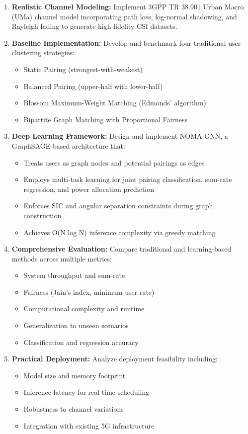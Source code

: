\begin{enumerate}
    \item \textbf{Realistic Channel Modeling:} Implement 3GPP TR 38.901 Urban Macro (UMa) channel model incorporating path loss, log-normal shadowing, and Rayleigh fading to generate high-fidelity CSI datasets.
    
    \item \textbf{Baseline Implementation:} Develop and benchmark four traditional user clustering strategies:
    \begin{itemize}
        \item Static Pairing (strongest-with-weakest)
        \item Balanced Pairing (upper-half with lower-half)
        \item Blossom Maximum-Weight Matching (Edmonds' algorithm)
        \item Bipartite Graph Matching with Proportional Fairness
    \end{itemize}
    
    \item \textbf{Deep Learning Framework:} Design and implement NOMA-GNN, a GraphSAGE-based architecture that:
    \begin{itemize}
        \item Treats users as graph nodes and potential pairings as edges
        \item Employs multi-task learning for joint pairing classification, sum-rate regression, and power allocation prediction
        \item Enforces SIC and angular separation constraints during graph construction
        \item Achieves O(N log N) inference complexity via greedy matching
    \end{itemize}
    
    \item \textbf{Comprehensive Evaluation:} Compare traditional and learning-based methods across multiple metrics:
    \begin{itemize}
        \item System throughput and sum-rate
        \item Fairness (Jain's index, minimum user rate)
        \item Computational complexity and runtime
        \item Generalization to unseen scenarios
        \item Classification and regression accuracy
    \end{itemize}
    
    \item \textbf{Practical Deployment:} Analyze deployment feasibility including:
    \begin{itemize}
        \item Model size and memory footprint
        \item Inference latency for real-time scheduling
        \item Robustness to channel variations
        \item Integration with existing 5G infrastructure
    \end{itemize}
\end{enumerate}

